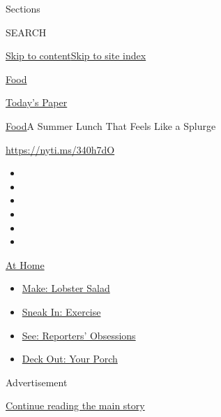 Sections

SEARCH

\protect\hyperlink{site-content}{Skip to
content}\protect\hyperlink{site-index}{Skip to site index}

\href{https://www.nytimes.com/section/food}{Food}

\href{https://myaccount.nytimes.com/auth/login?response_type=cookie\&client_id=vi}{}

\href{https://www.nytimes.com/section/todayspaper}{Today's Paper}

\href{/section/food}{Food}\textbar{}A Summer Lunch That Feels Like a
Splurge

\url{https://nyti.ms/340h7dO}

\begin{itemize}
\item
\item
\item
\item
\item
\item
\end{itemize}

\href{https://www.nytimes.com/spotlight/at-home?action=click\&pgtype=Article\&state=default\&region=TOP_BANNER\&context=at_home_menu}{At
Home}

\begin{itemize}
\tightlist
\item
  \href{https://www.nytimes.com/2020/08/14/dining/lobster-salad-recipe.html?action=click\&pgtype=Article\&state=default\&region=TOP_BANNER\&context=at_home_menu}{Make:
  Lobster Salad}
\item
  \href{https://www.nytimes.com/2020/08/15/at-home/coronavirus-at-home-quick-exercises.html?action=click\&pgtype=Article\&state=default\&region=TOP_BANNER\&context=at_home_menu}{Sneak
  In: Exercise}
\item
  \href{https://www.nytimes.com/interactive/2020/at-home/even-more-reporters-editors-diaries-lists-recommendations.html?action=click\&pgtype=Article\&state=default\&region=TOP_BANNER\&context=at_home_menu}{See:
  Reporters' Obsessions}
\item
  \href{https://www.nytimes.com/2020/08/15/at-home/coronavirus-fall-patio-furniture.html?action=click\&pgtype=Article\&state=default\&region=TOP_BANNER\&context=at_home_menu}{Deck
  Out: Your Porch}
\end{itemize}

Advertisement

\protect\hyperlink{after-top}{Continue reading the main story}

